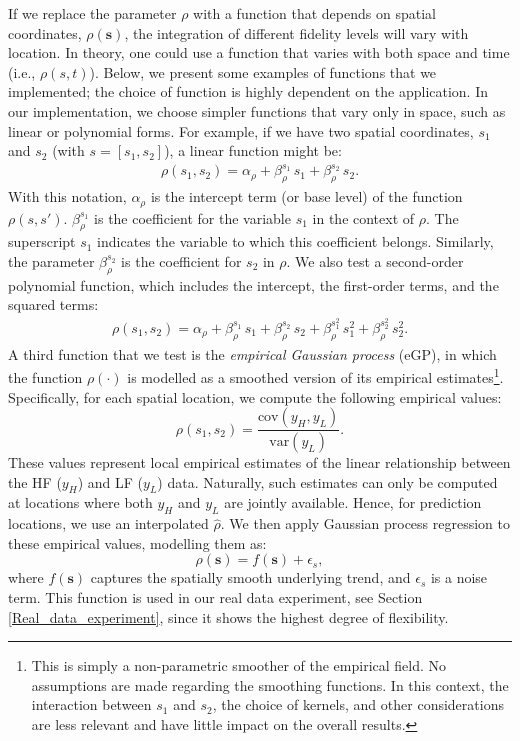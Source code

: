 \documentclass[12pt]{article}
\begin{document}
\noindent
\hangindent=-5mm
If we replace the parameter \( \rho \) with a function that depends on spatial coordinates, \( \rho(\bm{s}) \), the integration of different fidelity levels will vary with location. In theory, one could use a function that varies with both space and time (i.e., \( \rho(s,t) \)). 
\noindent
\hangindent=-5mm
Below, we present some examples of functions that we implemented; the choice of function is highly dependent on the application. In our implementation, we choose simpler functions that vary only in space, such as linear or polynomial forms. For example, if we have two spatial coordinates, \( s_1 \) and \( s_2 \) (with \( s = [s_1,s_2] \)), a linear function might be:
\begin{align}
    \rho(s_1,s_2) = \alpha_{\rho} + \beta^{s_1}_{\rho}\, s_1 + \beta^{s_2}_{\rho}\, s_2.
\end{align}
With this notation, $\alpha_{\rho}$ is the intercept term (or base level) of the function $\rho(s, s')$.
$\beta^{s_1}_{\rho}$ is the coefficient for the variable $s_1$ in the context of $\rho$. The superscript $s_1$ indicates the variable to which this coefficient belongs.
Similarly, the parameter $\beta^{s_2}_{\rho}$ is the coefficient for $s_2$ in $\rho$. We also test a second-order polynomial function, which includes the intercept, the first-order terms, and the squared terms:
\begin{align}
    \rho(s_1,s_2) = \alpha_{\rho} + \beta^{s_1}_{\rho}\, s_1 + \beta^{s_2}_{\rho}\, s_2 + \beta^{s^2_1}_{\rho}\, s_1^2 +  \beta^{s^2_2}_{\rho}\, s_2^2.
\end{align}
A third function that we test is the \textit{empirical Gaussian process} (eGP), in which the function $\rho(\cdot)$ is modelled as a smoothed version of its empirical estimates\footnote{This is simply a non-parametric smoother of the empirical field. No assumptions are made regarding the smoothing functions. In this context, the interaction between $s_1$ and $s_2$, the choice of kernels, and other considerations are less relevant and have little impact on the overall results.}. Specifically, for each spatial location, we compute the following empirical values:
\begin{equation}
    \rho(s_1, s_2) = \frac{\text{cov}(y_H, y_L)}{\text{var}(y_L)}.
\end{equation}
These values represent local empirical estimates of the linear relationship between the HF ($y_H$) and LF ($y_L$) data. Naturally, such estimates can only be computed at locations where both $y_H$ and $y_L$ are jointly available. Hence, for prediction locations, we use an interpolated $\hat{\rho}$. We then apply Gaussian process regression to these empirical values, modelling them as:
\begin{equation}
\rho(\bm{s}) = f(\bm{s}) + \epsilon_s,
\end{equation}
where $f(\bm{s})$ captures the spatially smooth underlying trend, and $\epsilon_s$ is a noise term. This function is used in our real data experiment, see Section \ref{Real_data_experiment}, since it shows the highest degree of flexibility. 
\end{document}
